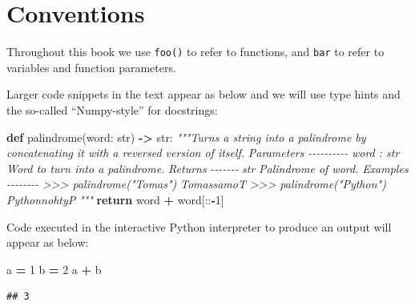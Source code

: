 \documentclass[
]{krantz}
\makeatletter
\newenvironment{Shaded}{\begin{snugshade}}{\end{snugshade}}
\newcommand{\BuiltInTok}[1]{#1}
\newcommand{\CommentTok}[1]{\textcolor[rgb]{0.37,0.37,0.37}{\textit{#1}}}
\newcommand{\ControlFlowTok}[1]{\textcolor[rgb]{0.27,0.27,0.27}{\textbf{#1}}}
\newcommand{\DecValTok}[1]{\textcolor[rgb]{0.06,0.06,0.06}{#1}}
\newcommand{\KeywordTok}[1]{\textcolor[rgb]{0.27,0.27,0.27}{\textbf{#1}}}
\newcommand{\NormalTok}[1]{#1}
\newcommand{\OperatorTok}[1]{\textcolor[rgb]{0.43,0.43,0.43}{\textbf{#1}}}
\newenvironment{kframe}{%
\medskip{}
\setlength{\fboxsep}{.8em}
 \def\at@end@of@kframe{}%
 \ifinner\ifhmode%
  \def\at@end@of@kframe{\end{minipage}}%
  \begin{minipage}{\columnwidth}%
 \fi\fi%
 \def\FrameCommand##1{\hskip\@totalleftmargin \hskip-\fboxsep
 \colorbox{shadecolor}{##1}\hskip-\fboxsep
     \hskip-\linewidth \hskip-\@totalleftmargin \hskip\columnwidth}%
 \MakeFramed {\advance\hsize-\width
   \@totalleftmargin\z@ \linewidth\hsize
   \@setminipage}}%
 {\par\unskip\endMakeFramed%
 \at@end@of@kframe}
\renewenvironment{Shaded}{\begin{kframe}}{\end{kframe}}
\makeatother
\begin{document}
\hypertarget{conventions}{%
\section*{Conventions}\label{conventions}}


Throughout this book we use \texttt{foo()} to refer to functions, and \texttt{bar} to refer to variables and function parameters.

Larger code snippets in the text appear as below and we will use type hints and the so-called ``Numpy-style'' for docstrings:

\begin{Shaded}
\begin{Highlighting}[]
\KeywordTok{def}\NormalTok{ palindrome(word: }\BuiltInTok{str}\NormalTok{) }\OperatorTok{{-}\textgreater{}} \BuiltInTok{str}\NormalTok{:}
    \CommentTok{"""Turns a string into a palindrome by concatenating it with a reversed version of itself.}
\CommentTok{    }
\CommentTok{    Parameters}
\CommentTok{    {-}{-}{-}{-}{-}{-}{-}{-}{-}{-}}
\CommentTok{    word : str}
\CommentTok{        Word to turn into a palindrome.}
\CommentTok{    }
\CommentTok{    Returns}
\CommentTok{    {-}{-}{-}{-}{-}{-}{-}}
\CommentTok{    str}
\CommentTok{        Palindrome of word.}
\CommentTok{    }
\CommentTok{    Examples}
\CommentTok{    {-}{-}{-}{-}{-}{-}{-}{-}}
\CommentTok{    \textgreater{}\textgreater{}\textgreater{} palindrome("Tomas")}
\CommentTok{    \textquotesingle{}TomassamoT\textquotesingle{}}
\CommentTok{    \textgreater{}\textgreater{}\textgreater{} palindrome("Python")}
\CommentTok{    \textquotesingle{}PythonnohtyP\textquotesingle{}}
\CommentTok{    """}
    \ControlFlowTok{return}\NormalTok{ word }\OperatorTok{+}\NormalTok{ word[::}\OperatorTok{{-}}\DecValTok{1}\NormalTok{]}
\end{Highlighting}
\end{Shaded}

Code executed in the interactive Python interpreter to produce an output will appear as below:

\begin{Shaded}
\begin{Highlighting}[]
\NormalTok{a }\OperatorTok{=} \DecValTok{1}
\NormalTok{b }\OperatorTok{=} \DecValTok{2}
\NormalTok{a }\OperatorTok{+}\NormalTok{ b}
\end{Highlighting}
\end{Shaded}

\begin{verbatim}
## 3
\end{verbatim}
\end{document}
